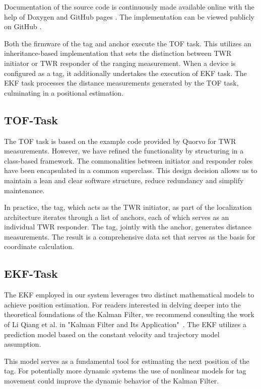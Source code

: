 \documentclass[final, conference, a4paper]{IEEEtran}
\begin{document}
Documentation of the source code is continuously made available online with the help of Doxygen and GitHub pages \cite{doxygen-doku}.
The implementation can be viewed publicly on GitHub \cite{uwb-tracking}.

Both the firmware of the tag and anchor execute the \ac{TOF} task.
This utilizes an inheritance-based implementation that sets the distinction between \ac{TWR} initiator or \ac{TWR} responder of the ranging measurement.
When a device is configured as a tag,
it additionally undertakes the execution of \ac{EKF} task.
The \ac{EKF} task processes the distance measurements generated by the \ac{TOF} task,
culminating in a positional estimation.

\subsection{TOF-Task}\label{section:firmware-tof}
The \ac{TOF} task is based on the example code
provided by Quorvo for \ac{TWR} measurements.
However, we have refined the functionality by structuring in a class-based framework.
The commonalities between initiator and responder roles have been
encapsulated in a common superclass.
This design decision allows us to maintain a lean and clear software structure,
reduce redundancy and simplify maintenance.

In practice, the tag, which acts as the \ac{TWR} initiator, as part of the localization architecture iterates through a list of anchors, each of which serves as an individual \ac{TWR} responder. 
The tag, jointly with the anchor, generates distance measurements. 
The result is a comprehensive data set that serves as the basis for coordinate calculation. 

\subsection{EKF-Task}\label{section:firmware-ekf}
The \ac{EKF} employed in our system leverages two distinct mathematical models
to achieve position estimation.
For readers interested in delving deeper into the theoretical foundations of the
Kalman Filter, we recommend consulting the work of Li Qiang et al. in
"Kalman Filter and Its Application"~\cite{Kalman}.
The \ac{EKF} utilizes a prediction model based on the constant velocity and trajectory model assumption.

This model serves as a fundamental tool for estimating the next position of the tag.
For potentially more dynamic systems the use of nonlinear models
for tag movement could improve the dynamic behavior of the Kalman Filter.
\end{document}
